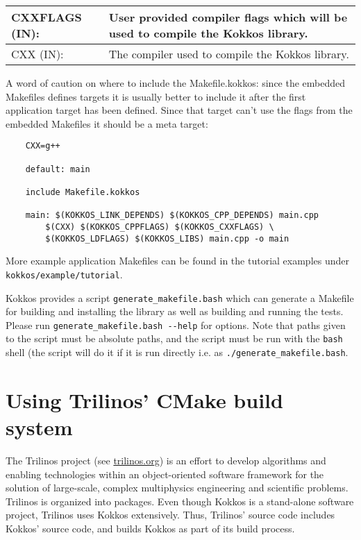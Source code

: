 \begin{table}
\begin{small}
\begin{tabular}[t]{p{}p{}}
\hline\hline
    CXXFLAGS (IN): & User provided compiler flags which will be used to compile the Kokkos library. \\

\hline
    CXX (IN): & The compiler used to compile the Kokkos library. \\
\hline\hline
\end{tabular}
\end{small}
\end{table}

    A word of caution on where to include the Makefile.kokkos:
    since the embedded Makefiles defines targets it is usually
    better to include it after the first application target
    has been defined. Since that target can't use the flags
    from the embedded Makefiles it should be a meta target:

\begin{lstlisting}    
    CXX=g++
    
    default: main
    
    include Makefile.kokkos
    
    main: $(KOKKOS_LINK_DEPENDS) $(KOKKOS_CPP_DEPENDS) main.cpp
        $(CXX) $(KOKKOS_CPPFLAGS) $(KOKKOS_CXXFLAGS) \
        $(KOKKOS_LDFLAGS) $(KOKKOS_LIBS) main.cpp -o main
\end{lstlisting}

More example application Makefiles can be found in the tutorial examples under \verb!kokkos/example/tutorial!.

Kokkos provides a script \lstinline|generate_makefile.bash| which can generate a Makefile for building and installing the library
as well as building and running the tests. Please run \lstinline|generate_makefile.bash --help| for options. 
Note that paths given to the script must be absolute paths, and the script must be run with the \lstinline|bash| shell (the script will
do it if it is run directly i.e. as \lstinline|./generate_makefile.bash|.


\section{Using Trilinos' CMake build system}\label{S:build:Trilinos}

The Trilinos project (see \url{trilinos.org}) is an effort to develop
algorithms and enabling technologies within an object-oriented
software framework for the solution of large-scale, complex
multiphysics engineering and scientific problems.  Trilinos is
organized into packages.  Even though Kokkos is a stand-alone software
project, Trilinos uses Kokkos extensively.  Thus, Trilinos' source
code includes Kokkos' source code, and builds Kokkos as part of its
build process.

